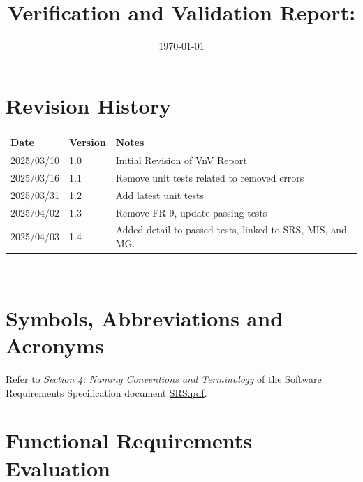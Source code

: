\documentclass[12pt, titlepage]{article}
\begin{document}
\title{Verification and Validation Report: \progname}
\author{\authname}
\date{\today}

\maketitle


\section{Revision History}

\begin{tabularx}{\textwidth}{p{3cm}p{2cm}X}
  \toprule {\bf Date} & {\bf Version} & {\bf Notes}\\
  \midrule
  2025/03/10 & 1.0 & Initial Revision of VnV Report\\
  2025/03/16 & 1.1 & Remove unit tests related to removed errors\\
  2025/03/31 & 1.2 & Add latest unit tests\\
  2025/04/02 & 1.3 & Remove FR-9, update passing tests\\
  2025/04/03 & 1.4 & Added detail to passed tests, linked to SRS, MIS, and MG.\\
  \bottomrule
\end{tabularx}

~\newpage

\section{Symbols, Abbreviations and Acronyms}

Refer to \textit{Section 4: Naming Conventions and Terminology} of
the Software Requirements Specification document
\href{https://github.com/Spitgranger/SyncMaster/blob/main/docs/SRS-Volere/SRS.pdf}{SRS.pdf}.

\newpage

\tableofcontents

\listoftables %

\listoffigures %

\newpage


\section{Functional Requirements Evaluation}
\end{document}
